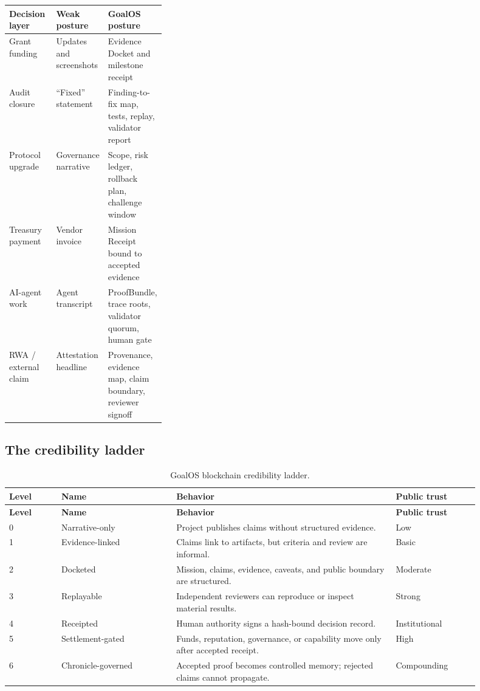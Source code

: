 \documentclass[11pt]{article}
\begin{document}
\begin{center}
\begin{tabularx}{0.96\linewidth}{p{0.30\linewidth} X X}
\toprule
\textbf{Decision layer} & \textbf{Weak posture} & \textbf{GoalOS posture}\\
\midrule
Grant funding & Updates and screenshots & Evidence Docket and milestone receipt\\
Audit closure & ``Fixed'' statement & Finding-to-fix map, tests, replay, validator report\\
Protocol upgrade & Governance narrative & Scope, risk ledger, rollback plan, challenge window\\
Treasury payment & Vendor invoice & Mission Receipt bound to accepted evidence\\
AI-agent work & Agent transcript & ProofBundle, trace roots, validator quorum, human gate\\
RWA / external claim & Attestation headline & Provenance, evidence map, claim boundary, reviewer signoff\\
\bottomrule
\end{tabularx}
\end{center}

\subsection{The credibility ladder}

\begin{longtable}{p{0.10\linewidth} p{0.22\linewidth} p{0.42\linewidth} p{0.16\linewidth}}
\caption{GoalOS blockchain credibility ladder.}\\
\toprule
\textbf{Level} & \textbf{Name} & \textbf{Behavior} & \textbf{Public trust}\\
\midrule
\endfirsthead
\toprule
\textbf{Level} & \textbf{Name} & \textbf{Behavior} & \textbf{Public trust}\\
\midrule
\endhead
0 & Narrative-only & Project publishes claims without structured evidence. & Low\\
1 & Evidence-linked & Claims link to artifacts, but criteria and review are informal. & Basic\\
2 & Docketed & Mission, claims, evidence, caveats, and public boundary are structured. & Moderate\\
3 & Replayable & Independent reviewers can reproduce or inspect material results. & Strong\\
4 & Receipted & Human authority signs a hash-bound decision record. & Institutional\\
5 & Settlement-gated & Funds, reputation, governance, or capability move only after accepted receipt. & High\\
6 & Chronicle-governed & Accepted proof becomes controlled memory; rejected claims cannot propagate. & Compounding\\
\bottomrule
\end{longtable}
\end{document}
